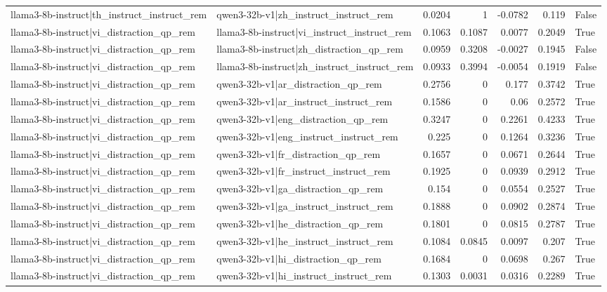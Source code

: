 \begin{table}
\begin{tabular}{l l r r r r l}
llama3-8b-instruct|th_instruct_instruct_rem & qwen3-32b-v1|zh_instruct_instruct_rem & 0.0204 & 1 & -0.0782 & 0.119 & False \\
llama3-8b-instruct|vi_distraction_qp_rem & llama3-8b-instruct|vi_instruct_instruct_rem & 0.1063 & 0.1087 & 0.0077 & 0.2049 & True \\
llama3-8b-instruct|vi_distraction_qp_rem & llama3-8b-instruct|zh_distraction_qp_rem & 0.0959 & 0.3208 & -0.0027 & 0.1945 & False \\
llama3-8b-instruct|vi_distraction_qp_rem & llama3-8b-instruct|zh_instruct_instruct_rem & 0.0933 & 0.3994 & -0.0054 & 0.1919 & False \\
llama3-8b-instruct|vi_distraction_qp_rem & qwen3-32b-v1|ar_distraction_qp_rem & 0.2756 & 0 & 0.177 & 0.3742 & True \\
llama3-8b-instruct|vi_distraction_qp_rem & qwen3-32b-v1|ar_instruct_instruct_rem & 0.1586 & 0 & 0.06 & 0.2572 & True \\
llama3-8b-instruct|vi_distraction_qp_rem & qwen3-32b-v1|eng_distraction_qp_rem & 0.3247 & 0 & 0.2261 & 0.4233 & True \\
llama3-8b-instruct|vi_distraction_qp_rem & qwen3-32b-v1|eng_instruct_instruct_rem & 0.225 & 0 & 0.1264 & 0.3236 & True \\
llama3-8b-instruct|vi_distraction_qp_rem & qwen3-32b-v1|fr_distraction_qp_rem & 0.1657 & 0 & 0.0671 & 0.2644 & True \\
llama3-8b-instruct|vi_distraction_qp_rem & qwen3-32b-v1|fr_instruct_instruct_rem & 0.1925 & 0 & 0.0939 & 0.2912 & True \\
llama3-8b-instruct|vi_distraction_qp_rem & qwen3-32b-v1|ga_distraction_qp_rem & 0.154 & 0 & 0.0554 & 0.2527 & True \\
llama3-8b-instruct|vi_distraction_qp_rem & qwen3-32b-v1|ga_instruct_instruct_rem & 0.1888 & 0 & 0.0902 & 0.2874 & True \\
llama3-8b-instruct|vi_distraction_qp_rem & qwen3-32b-v1|he_distraction_qp_rem & 0.1801 & 0 & 0.0815 & 0.2787 & True \\
llama3-8b-instruct|vi_distraction_qp_rem & qwen3-32b-v1|he_instruct_instruct_rem & 0.1084 & 0.0845 & 0.0097 & 0.207 & True \\
llama3-8b-instruct|vi_distraction_qp_rem & qwen3-32b-v1|hi_distraction_qp_rem & 0.1684 & 0 & 0.0698 & 0.267 & True \\
llama3-8b-instruct|vi_distraction_qp_rem & qwen3-32b-v1|hi_instruct_instruct_rem & 0.1303 & 0.0031 & 0.0316 & 0.2289 & True \\

\end{tabular}
\end{table}
